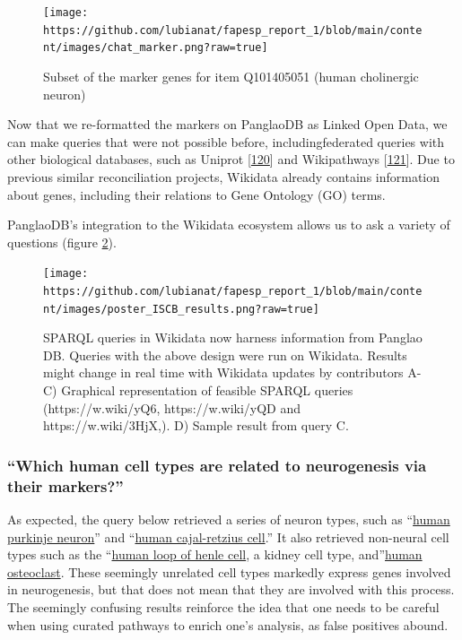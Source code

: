 \begin{figure}
\hypertarget{fig:chat_marker}{%
\centering
\texttt{[image: https://github.com/lubianat/fapesp\_report\_1/blob/main/content/images/chat\_marker.png?raw=true]}
\caption{Subset of the marker genes for item Q101405051 (human cholinergic neuron)}\label{fig:chat_marker}
}
\end{figure}

Now that we re-formatted the markers on PanglaoDB as Linked Open Data, we can make queries that were not possible before, includingfederated queries with other biological databases, such as Uniprot {[}\protect\hyperlink{ref-HUJ9NzAb}{120}{]}
and Wikipathways {[}\protect\hyperlink{ref-AgOOCR24}{121}{]}.
Due to previous similar reconciliation projects, Wikidata already contains information about genes, including their relations to Gene Ontology (GO) terms.

PanglaoDB's integration to the Wikidata ecosystem allows us to ask a variety of questions (figure \ref{fig:iscb_results}).

\begin{figure}
\hypertarget{fig:iscb_results}{%
\centering
\texttt{[image: https://github.com/lubianat/fapesp\_report\_1/blob/main/content/images/poster\_ISCB\_results.png?raw=true]}
\caption{SPARQL queries in Wikidata now harness information from Panglao DB. Queries with the above design were run on Wikidata. Results might change in real time with Wikidata updates by contributors A-C) Graphical representation of feasible SPARQL queries (https://w.wiki/yQ6, https://w.wiki/yQD and https://w.wiki/3HjX,). D) Sample result from query C.}\label{fig:iscb_results}
}
\end{figure}

\hypertarget{which-human-cell-types-are-related-to-neurogenesis-via-their-markers}{%
\subsubsection{``Which human cell types are related to neurogenesis via their markers?''}\label{which-human-cell-types-are-related-to-neurogenesis-via-their-markers}}

As expected, the query below retrieved a series of neuron types, such as ``\href{https://www.wikidata.org/wiki/Q101404913}{human purkinje neuron}'' and ``\href{https://www.wikidata.org/wiki/Q101405091}{human cajal-retzius cell}.'' It also retrieved non-neural cell types such as the ``\href{https://www.wikidata.org/wiki/Q101405109}{human loop of henle cell}, a kidney cell type, and''\href{https://www.wikidata.org/wiki/Q101404928}{human osteoclast}. These seemingly unrelated cell types markedly express genes involved in neurogenesis, but that does not mean that they are involved with this process. The seemingly confusing results reinforce the idea that one needs to be careful when using curated pathways to enrich one's analysis, as false positives abound.

